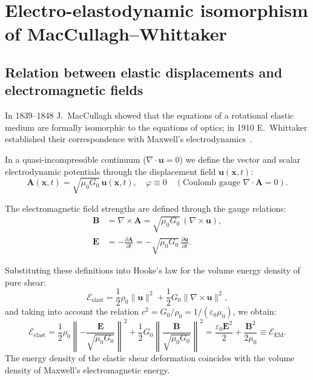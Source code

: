\documentclass[11pt,a4paper]{article}
\theoremstyle{definition}
\theoremstyle{remark}
\begin{document}
\section{Electro-elastodynamic isomorphism\\ of MacCullagh--Whittaker}
	
\subsection{Relation between elastic displacements and electromagnetic fields}
	
In 1839--1848 J.~MacCullagh showed that the equations of a rotational elastic medium are formally isomorphic to the equations of optics; in 1910 E.~Whittaker established their correspondence with Maxwell's electrodynamics~\cite{MacCullagh1848,Whittaker1910}.
	
In a quasi-incompressible continuum ($\nabla \cdot \mathbf{u} = 0$) we define the vector and scalar electrodynamic potentials through the displacement field $\mathbf{u}(\mathbf{x}, t)$:
\begin{equation}
	\mathbf{A}(\mathbf{x}, t) = \sqrt{\mu_0 G_0} \, \mathbf{u}(\mathbf{x}, t), \quad \varphi \equiv 0 \quad (\text{Coulomb gauge } \nabla \cdot \mathbf{A} = 0).
	\label{eq:potentials_def}
	\end{equation}
	
The electromagnetic field strengths are defined through the gauge relations:
\begin{align}
\mathbf{B} &= \nabla \times \mathbf{A} = \sqrt{\mu_0 G_0} \, (\nabla \times \mathbf{u}), \label{eq:field_B_def} \\
\mathbf{E} &= -\frac{\partial \mathbf{A}}{\partial t} = -\sqrt{\mu_0 G_0} \, \frac{\partial \mathbf{u}}{\partial t}. \label{eq:field_E_def}
\end{align}
	
Substituting these definitions into Hooke's law for the volume energy density of pure shear:
\begin{equation}
	\mathcal{E}_{\mathrm{elast}} = \frac{1}{2} \rho_0 \|\dot{\mathbf{u}}\|^2 + \frac{1}{2} G_0 \|\nabla \times \mathbf{u}\|^2,
	\label{eq:elastic_energy_density_raw}
\end{equation}
and taking into account the relation $c^2 = G_0 / \rho_0 = 1/(\varepsilon_0 \mu_0)$, we obtain:
\begin{equation}
	\mathcal{E}_{\mathrm{elast}} = \frac{1}{2} \rho_0 \left\| -\frac{\mathbf{E}}{\sqrt{\mu_0 G_0}} \right\|^2 + \frac{1}{2} G_0 \left\| \frac{\mathbf{B}}{\sqrt{\mu_0 G_0}} \right\|^2 = \frac{\varepsilon_0 \mathbf{E}^2}{2} + \frac{\mathbf{B}^2}{2\mu_0} \equiv \mathcal{E}_{\mathrm{EM}}.
	\label{eq:em_energy_density_match}
\end{equation}
The energy density of the elastic shear deformation coincides with the volume density of Maxwell's electromagnetic energy.
	
\end{document}

